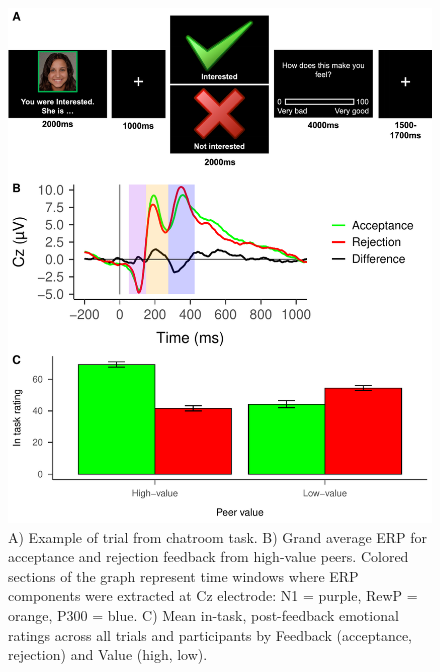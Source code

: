 \documentclass[
  man,floatsintext]{apa7}
\begin{document}
\begin{figure}
\centering
\includegraphics{BUDS_tables_and_figures_working_alternative_electrodes_files/figure-latex/unnamed-chunk-6-1.pdf}
\caption{\label{fig:unnamed-chunk-6}A) Example of trial from chatroom task. B) Grand average ERP for acceptance and rejection feedback from high-value peers. Colored sections of the graph represent time windows where ERP components were extracted at Cz electrode: N1 = purple, RewP = orange, P300 = blue. C) Mean in-task, post-feedback emotional ratings across all trials and participants by Feedback (acceptance, rejection) and Value (high, low).}
\end{figure}
\end{document}
